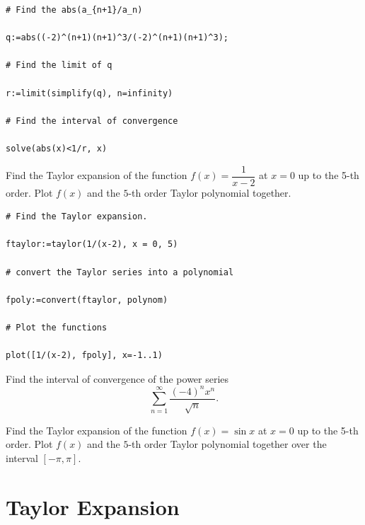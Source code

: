 \documentclass[en,11pt,simple]{elegantbook}
\let\BeginKnitrBlock\begin \let\EndKnitrBlock\end
\begin{document}
\BeginKnitrBlock{solution}{}{}
{}

\begin{verbatim}
# Find the abs(a_{n+1}/a_n)

q:=abs((-2)^(n+1)(n+1)^3/(-2)^(n+1)(n+1)^3);

# Find the limit of q

r:=limit(simplify(q), n=infinity)

# Find the interval of convergence

solve(abs(x)<1/r, x)
\end{verbatim}
\EndKnitrBlock{solution}

\BeginKnitrBlock{example}{}{}
\protect\hypertarget{exm:unnamed-chunk-232}{}{\label{exm:unnamed-chunk-232} }
Find the Taylor expansion of the function \(f(x)=\dfrac{1}{x-2}\) at \(x=0\) up to the 5-th order. Plot \(f(x)\) and the \(5\)-th order Taylor polynomial together.
\EndKnitrBlock{example}

\BeginKnitrBlock{solution}{}{}
{}

\begin{verbatim}
# Find the Taylor expansion.

ftaylor:=taylor(1/(x-2), x = 0, 5)

# convert the Taylor series into a polynomial

fpoly:=convert(ftaylor, polynom)

# Plot the functions

plot([1/(x-2), fpoly], x=-1..1)
\end{verbatim}
\EndKnitrBlock{solution}

\BeginKnitrBlock{exercise}{}{}
\protect\hypertarget{exr:unnamed-chunk-234}{}{\label{exr:unnamed-chunk-234} }
Find the interval of convergence of the power series
\[
\sum\limits_{n=1}^{\infty}\dfrac{(-4)^nx^n}{\sqrt{n}}.
\]
\EndKnitrBlock{exercise}

\BeginKnitrBlock{exercise}{}{}
\protect\hypertarget{exr:unnamed-chunk-235}{}{\label{exr:unnamed-chunk-235} }
Find the Taylor expansion of the function \(f(x)=\sin x\) at \(x=0\) up to the 5-th order. Plot \(f(x)\) and the \(5\)-th order Taylor polynomial together over the interval \([-\pi,\pi]\).
\EndKnitrBlock{exercise}

\hypertarget{taylor-expansion}{%
\section{Taylor Expansion}\label{taylor-expansion}}
\end{document}
